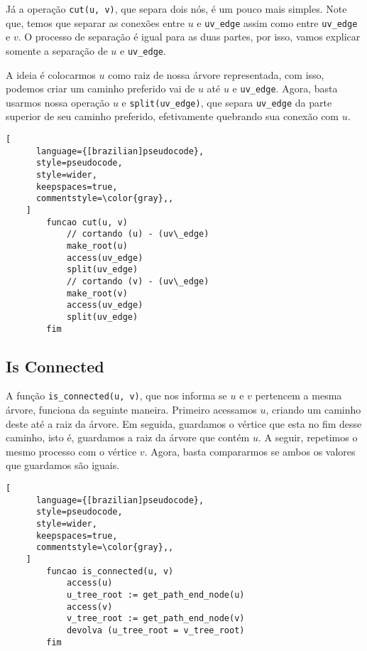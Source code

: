 Já a operação \texttt{cut(u, v)}, que separa dois nós, é um pouco mais simples. Note que, temos que separar as conexões entre $u$ e \texttt{uv\_edge} assim como entre \texttt{uv\_edge} e $v$. O processo de separação é igual para as duas partes, por isso, vamos explicar somente a separação de $u$ e \texttt{uv\_edge}.

A ideia é colocarmos $u$ como raiz de nossa árvore representada, com isso, podemos criar um caminho preferido vai de $u$ até $u$ e \texttt{uv\_edge}. Agora, basta usarmos nossa operação $u$ e \texttt{split(uv\_edge)}, que separa \texttt{uv\_edge} da parte superior de seu caminho preferido, efetivamente quebrando sua conexão com $u$.

\begin{programruledcaption}{\label{lct:cut}}
    \begin{lstlisting}[
      language={[brazilian]pseudocode},
      style=pseudocode,
      style=wider,
      keepspaces=true,
      commentstyle=\color{gray},,
    ]
        funcao cut(u, v)
            // cortando (u) - (uv\_edge)
            make_root(u)
            access(uv_edge)
            split(uv_edge)
            // cortando (v) - (uv\_edge)
            make_root(v)
            access(uv_edge)
            split(uv_edge)
        fim
    \end{lstlisting}
\end{programruledcaption}

\subsection{Is Connected}
\label{subsection:lct-is-connected}

A função \texttt{is\_connected(u, v)}, que nos informa se $u$ e $v$ pertencem a mesma árvore, funciona da seguinte maneira. Primeiro acessamos $u$, criando um caminho deste até a raiz da árvore. Em seguida, guardamos o vértice que esta no fim desse caminho, isto é, guardamos a raiz da árvore que contém $u$. A seguir, repetimos o mesmo processo com o vértice $v$. Agora, basta compararmos se ambos os valores que guardamos são iguais.

\begin{programruledcaption}{\label{lct:is-connected}}
    \begin{lstlisting}[
      language={[brazilian]pseudocode},
      style=pseudocode,
      style=wider,
      keepspaces=true,
      commentstyle=\color{gray},,
    ]
        funcao is_connected(u, v)
            access(u)
            u_tree_root := get_path_end_node(u)
            access(v)
            v_tree_root := get_path_end_node(v)
            devolva (u_tree_root = v_tree_root)
        fim
    \end{lstlisting}
\end{programruledcaption}

